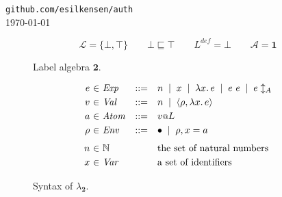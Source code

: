 \documentclass{article}
\makeatletter
\newcommand{\at}{\ensuremath{{\scriptstyle{@}}}}
\theoremstyle{definition}
\makeatother
\begin{document}
\begin{flushright}
  \texttt{github.com/esilkensen/auth}
  \\
  \today
\end{flushright}

\begin{figure}[h]
  \centering
  \[
  \mathcal{L} = \{ \bot, \top \}
  \qquad
  \bot \sqsubseteq \top
  \qquad
  L^{\mathit{def}} = \bot
  \qquad
  \mathcal{A} = \mathbf{1}
  \]
  \caption{Label algebra $\mathbf{2}$.}
  \label{fig:two}
\end{figure}

\begin{figure}[h]
  \centering
  \[
  \begin{array}[t]{r @{\ } c @{\ } l c l}
    e & \in & \mathit{Exp} & ::= &
    n\;\; |\;\;
    x\;\; |\;\;
    \lambda{x}.\, e\;\; |\;\;
    e\ e\;\; |\;\;
    e \updownarrow_{A} %
    \\[0.6ex]
    v & \in & \mathit{Val} & ::= &
    n\;\; |\;\;
    \langle{\rho, \lambda{x}.\, e\rangle}
    \\[0.6ex]
    a & \in & \mathit{Atom} & ::= &
    v \at L
    \\[0.6ex]
    \rho & \in & \mathit{Env} & ::= &
    \bullet\;\; |\;\;
    \rho, x = a
    \\[1.6ex]
    n & \in & \mathbb{N} & &
    \text{the set of natural numbers}
    \\[0.6ex]
    x & \in & \mathit{Var} & &
    \text{a set of identifiers}
  \end{array}
  \]
  \caption{Syntax of $\lambda_{\mathbf{2}}$.}
  \label{fig:syntax}
\end{figure}
\end{document}
